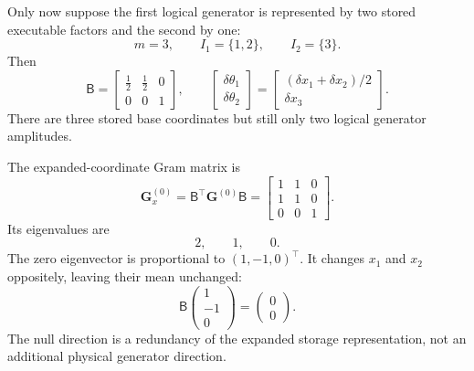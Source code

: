 \documentclass[11pt]{article}
\begin{document}
Only now suppose the first logical generator is represented by two stored
executable factors and the second by one:
\begin{equation}
m=3,\qquad
I_1=\{1,2\},\qquad
I_2=\{3\}.
\end{equation}
Then
\begin{equation}
\mathsf B
=
\begin{bmatrix}
\tfrac12&\tfrac12&0\\
0&0&1
\end{bmatrix},
\qquad
\begin{bmatrix}
\delta\theta_1\\
\delta\theta_2
\end{bmatrix}
=
\begin{bmatrix}
(\delta x_1+\delta x_2)/2\\
\delta x_3
\end{bmatrix}.
\label{eq:example-B}
\end{equation}
There are three stored base coordinates but still only two logical generator
amplitudes.

The expanded-coordinate Gram matrix is
\begin{equation}
\mathbf G_x^{(0)}
=
\mathsf B^\top\mathbf G^{(0)}\mathsf B
=
\begin{bmatrix}
1&1&0\\
1&1&0\\
0&0&1
\end{bmatrix}.
\label{eq:example-base-gram}
\end{equation}
Its eigenvalues are
\[
2,\qquad 1,\qquad 0.
\]
The zero eigenvector is proportional to
\((1,-1,0)^\top\).  It changes \(x_1\) and \(x_2\) oppositely, leaving their
mean unchanged:
\[
\mathsf B
\begin{pmatrix}1\\-1\\0\end{pmatrix}
=
\begin{pmatrix}0\\0\end{pmatrix}.
\]
The null direction is a redundancy of the expanded storage representation,
not an additional physical generator direction.
\end{document}
